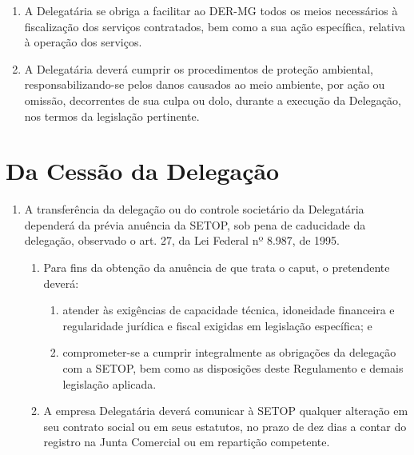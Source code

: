 \begin{enumerate}[resume, label=Art. \arabic*]
\begin{enumerate}[label= \S \arabic*]
\item A Delegatária se obriga a facilitar ao DER-MG todos os meios necessários à fiscalização dos serviços contratados, bem como a sua ação específica, relativa à operação dos serviços.

\item A Delegatária deverá cumprir os procedimentos de proteção ambiental, responsabilizando-se pelos danos causados ao meio ambiente, por ação ou omissão, decorrentes de sua culpa ou dolo, durante a execução da Delegação, nos termos da legislação pertinente.

\end{enumerate}

\end{enumerate}

\section{Da Cessão da Delegação}

\begin{enumerate}[resume, label=Art. \arabic*]

\item A transferência da delegação ou do controle societário da Delegatária dependerá da prévia anuência da SETOP, sob pena de caducidade da delegação, observado o art. 27, da Lei Federal nº 8.987, de 1995.

\begin{enumerate}[label= \S \arabic*] %

\item Para fins da obtenção da anuência de que trata o caput, o pretendente deverá:

\begin{enumerate}[label=\roman*.]

\item atender às exigências de capacidade técnica, idoneidade financeira e regularidade jurídica e fiscal exigidas em legislação específica; e

\item comprometer-se a cumprir integralmente as obrigações da delegação com a SETOP, bem como as disposições deste Regulamento e demais legislação aplicada.

\end{enumerate}

\item A empresa Delegatária deverá comunicar à SETOP qualquer alteração em seu contrato social ou em seus estatutos, no prazo de dez dias a contar do registro na Junta Comercial ou em repartição competente.

\end{enumerate}

\end{enumerate}

